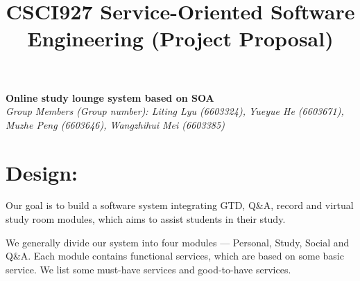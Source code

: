\documentclass[runningheads]{llncs}
\begin{document}
\title{\large{CSCI927 Service-Oriented Software Engineering (Project Proposal)}}
\author{}
\institute{}
\maketitle
\vspace{-1cm}



\begin{center}
\Large{\textbf{Online study lounge system based on SOA}} \\ %
\vspace{0.2cm}
\large{\emph{Group Members (Group number): Liting Lyu (6603324), Yueyue  He (6603671), Muzhe Peng (6603646), Wangzhihui Mei (6603385)}} \\%
\vspace{0.3cm}
\end{center}


\section*{Design:}
Our goal is to build a software system integrating GTD, Q\&A, record and virtual study room modules, which aims to assist students in their study. 

\noindent We generally divide our system into four modules --- Personal, Study, Social and Q\&A. Each module contains functional services, which are based on some basic service. We list some must-have services and good-to-have services.
\end{document}
